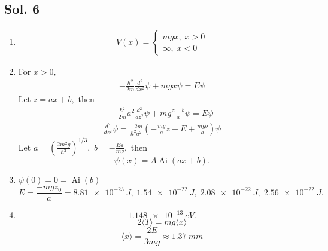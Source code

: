 \subsection*{Sol. 6}
\begin{enumerate}
    \item 
    \begin{align*}
        V(x) = \begin{cases}
        mgx, \; x>0\\
        \infty,\; x<0
        \end{cases}
    \end{align*}
    \item 
    For $x>0,$
    \begin{align*}
        -\frac{\hbar^2}{2m}
        \frac{d^2}{dx^2}
        \psi + mgx\psi = E\psi
    \end{align*}
    Let $z = ax+b,$ then 
    \begin{align*}
        -\frac{\hbar^2}{2m}
        a^2\frac{d^2}{dz^2}
        \psi + mg\frac{z-b}{a}\psi = E\psi
    \end{align*}
    \begin{align*}
        \frac{d^2}{dz^2}\psi
        =\frac{-2m}{\hbar^2a^2}
        \left(
        -\frac{mg}{a}z + E+\frac{mgb}{a}
        \right)\psi
    \end{align*}
    Let $
    a=\left(\frac{2m^2g}{\hbar^2}\right)^{1/3},
    $
    $b=-\frac{Ea}{mg},$ then
    $$
    \psi(x) = A\operatorname{Ai}(ax+b).
    $$
    \item 
    $\psi(0)=0=\operatorname{Ai}(b)$
    $$
    E=\frac{-mgz_0}{a}
    =\qty{8.81e-23}{J}, \; \qty{1.54e-22}{J}, \;
    \qty{2.08e-22}{J}, \; \qty{2.56e-22}{J}.
    $$
    \item 
    $$
    \qty{1.148e-13}{eV}.
    $$
    $$
    2\langle T\rangle
    =mg\langle x\rangle
    $$
    $$
    \langle x \rangle
    =\frac{2E}{3mg}
    \approx \qty{1.37}{mm}
    $$
\end{enumerate}

